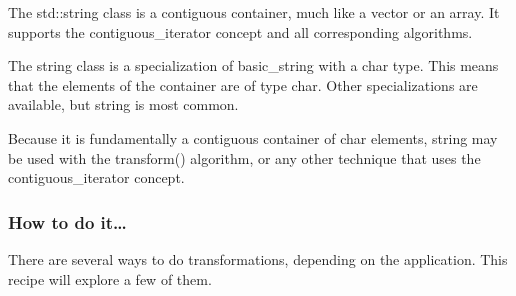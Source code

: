 
The std::string class is a contiguous container, much like a vector or an array. It supports the contiguous\_iterator concept and all corresponding algorithms.

The string class is a specialization of basic\_string with a char type. This means that the elements of the container are of type char. Other specializations are available, but string is most common.

Because it is fundamentally a contiguous container of char elements, string may be used with the transform() algorithm, or any other technique that uses the contiguous\_iterator concept.

\subsubsection{How to do it…}

There are several ways to do transformations, depending on the application. This recipe will explore a few of them.

